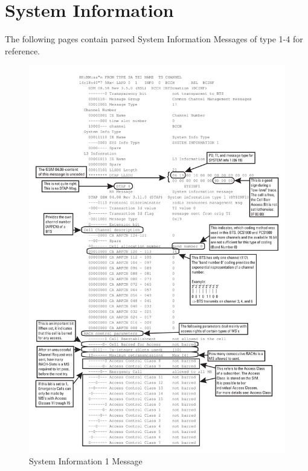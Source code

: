 \chapter{System Information}
\label{sec:system_infos}
The following pages contain parsed System Information Messages of type 1-4  for reference.
\begin{figure}
\centering
\includegraphics[width=.9\textwidth]{../Images/sysinfo1}
\caption{System Information 1 Message}
\end{figure}
